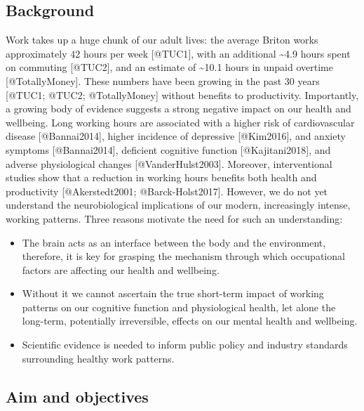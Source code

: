 \documentclass[
]{article}
\author{}
\date{\vspace{-2.5em}}
\begin{document}
\hypertarget{background}{%
\subsection{Background}\label{background}}

Work takes up a huge chunk of our adult lives: the average Briton works
approximately \(42\) hours per week {[}@TUC1{]}, with an additional
\textasciitilde4.9 hours spent on commuting {[}@TUC2{]}, and an estimate
of \textasciitilde10.1 hours in unpaid overtime {[}@TotallyMoney{]}.
These numbers have been growing in the past 30 years {[}@TUC1; @TUC2;
@TotallyMoney{]} without benefits to productivity. Importantly, a
growing body of evidence suggests a strong negative impact on our health
and wellbeing. Long working hours are associated with a higher risk of
cardiovascular disease {[}@Bannai2014{]}, higher incidence of depressive
{[}@Kim2016{]}, and anxiety symptoms {[}@Bannai2014{]}, deficient
cognitive function {[}@Kajitani2018{]}, and adverse physiological
changes {[}@VanderHulst2003{]}. Moreover, interventional studies show
that a reduction in working hours benefits both health and productivity
{[}@Akerstedt2001; @Barck-Holst2017{]}. However, we do not yet
understand the neurobiological implications of our modern, increasingly
intense, working patterns. Three reasons motivate the need for such an
understanding:

\begin{itemize}
\item
  The brain acts as an interface between the body and the environment,
  therefore, it is key for grasping the mechanism through which
  occupational factors are affecting our health and wellbeing.
\item
  Without it we cannot ascertain the true short-term impact of working
  patterns on our cognitive function and physiological health, let alone
  the long-term, potentially irreversible, effects on our mental health
  and wellbeing.
\item
  Scientific evidence is needed to inform public policy and industry
  standards surrounding healthy work patterns.
\end{itemize}

\newpage

\hypertarget{aim-and-objectives}{%
\subsection{Aim and objectives}\label{aim-and-objectives}}
\end{document}
